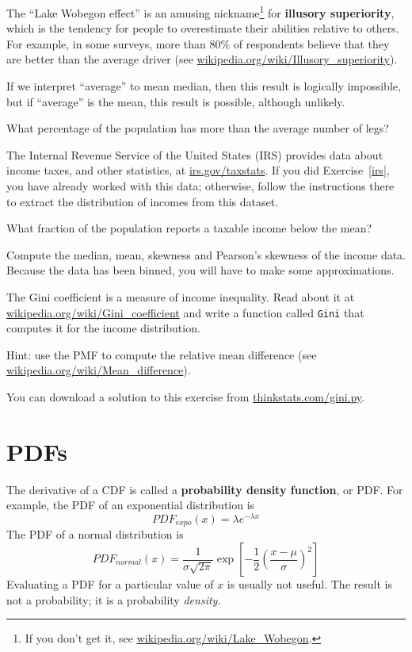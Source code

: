 \documentclass[12pt]{book}
\begin{document}
\begin{ex}

The ``Lake Wobegon effect'' is an amusing nickname\footnote{If you
  don't get it, see \url{wikipedia.org/wiki/Lake_Wobegon}.} for {\bf
  illusory superiority}, which is the tendency for people to
overestimate their abilities relative to others.  For example, in some
surveys, more than 80\% of respondents believe that they are better
than the average driver (see
  \url{wikipedia.org/wiki/Illusory_superiority}).

If we interpret ``average'' to mean median, then this result is
logically impossible, but if ``average'' is the mean, this result is
possible, although unlikely.

What percentage of the population has more than the average number
of legs?

\end{ex}


\begin{ex}
The Internal Revenue Service of the United States (IRS) provides data
about income taxes, and other statistics, at \url{irs.gov/taxstats}.
If you did Exercise~\ref{irs}, you have already worked with this data;
otherwise, follow the instructions there to extract the distribution
of incomes from this dataset.

What fraction of the population reports a taxable income below the
mean?

Compute the median, mean, skewness and Pearson's skewness of the income
data.  Because the data has been binned, you will have to make
some approximations.

The Gini coefficient is a measure of income inequality.
Read about it at \url{wikipedia.org/wiki/Gini_coefficient} and write a
function called {\tt Gini} that computes it for the income
distribution.

Hint: use the PMF to compute the relative mean difference
(see \url{wikipedia.org/wiki/Mean_difference}).

You can download a solution to this exercise from \url{thinkstats.com/gini.py}.

\end{ex}


\section{PDFs}
\label{density}

The derivative of a CDF is called a {\bf probability density function},
or PDF.  For example, the PDF of an exponential distribution is
%
\[ PDF_{expo}(x) = \lambda e^{-\lambda x}   \]
%
The PDF of a normal distribution is
%
\[ PDF_{normal}(x) = \frac{1}{\sigma \sqrt{2 \pi}} 
                 \exp \left[ -\frac{1}{2} 
                 \left( \frac{x - \mu}{\sigma} \right)^2 \right]  \]
%
Evaluating a PDF for a particular value of $x$ is usually not useful.
The result is not a probability; it is a probability {\em density}.
\end{document}
